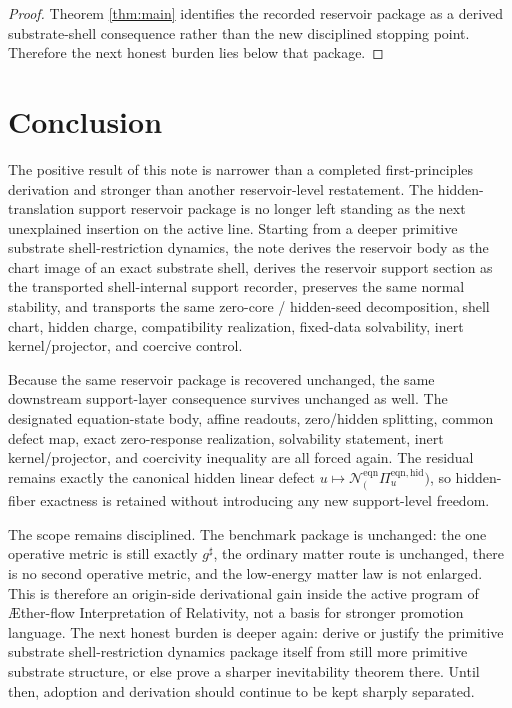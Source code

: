 \documentclass[11pt]{article}
\newcommand{\Aflow}{\AE{}ther-flow}
\newcommand{\TheoryName}{\Aflow{} Interpretation of Relativity}
\newcommand{\CompletedMetric}{g^{\sharp}}
\newcommand{\EqnProj}[1]{\Pi_{#1}^{\mathrm{eqn,hid}}}
\newcommand{\EqnLin}[1]{\mathcal N_{#1}^{\mathrm{eqn}}}
\begin{document}
\begin{proof}
Theorem \ref{thm:main} identifies the recorded reservoir package as a derived substrate-shell consequence rather than the new disciplined stopping point. Therefore the next honest burden lies below that package.
\end{proof}

\section{Conclusion}

The positive result of this note is narrower than a completed first-principles derivation and stronger than another reservoir-level restatement. The hidden-translation support reservoir package is no longer left standing as the next unexplained insertion on the active line. Starting from a deeper primitive substrate shell-restriction dynamics, the note derives the reservoir body as the chart image of an exact substrate shell, derives the reservoir support section as the transported shell-internal support recorder, preserves the same normal stability, and transports the same zero-core / hidden-seed decomposition, shell chart, hidden charge, compatibility realization, fixed-data solvability, inert kernel/projector, and coercive control.

Because the same reservoir package is recovered unchanged, the same downstream support-layer consequence survives unchanged as well. The designated equation-state body, affine readouts, zero/hidden splitting, common defect map, exact zero-response realization, solvability statement, inert kernel/projector, and coercivity inequality are all forced again. The residual remains exactly the canonical hidden linear defect \(u\mapsto\EqnLin(\EqnProj u)\), so hidden-fiber exactness is retained without introducing any new support-level freedom.

The scope remains disciplined. The benchmark package is unchanged: the one operative metric is still exactly \(\CompletedMetric\), the ordinary matter route is unchanged, there is no second operative metric, and the low-energy matter law is not enlarged. This is therefore an origin-side derivational gain inside the active program of \TheoryName{}, not a basis for stronger promotion language. The next honest burden is deeper again: derive or justify the primitive substrate shell-restriction dynamics package itself from still more primitive substrate structure, or else prove a sharper inevitability theorem there. Until then, adoption and derivation should continue to be kept sharply separated.
\end{document}
